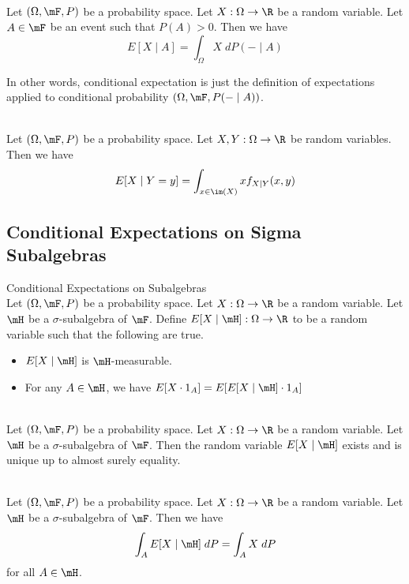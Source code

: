 \documentclass[a4paper]{article}
\begin{document}
\begin{lmm}{}{}\\
Let $(\Omega,\mF,P)$ be a probability space. Let $X:\Omega\to\R$ be a random variable. Let $A\in\mF$ be an event such that $P(A)>0$. Then we have $$E[X\;|\;A]=\int_\Omega X\;dP(-\;|\;A)$$
\end{lmm}

In other words, conditional expectation is just the definition of expectations applied to conditional probability $(\Omega,\mF,P(-\;|\;A))$. 

\begin{lmm}{}{}\\
Let $(\Omega,\mF,P)$ be a probability space. Let $X,Y:\Omega\to\R$ be random variables. Then we have $$E[X\;|\;Y=y]=\int_{x\in\im(X)}xf_{X|Y}(x,y)$$
\end{lmm}

\subsection{Conditional Expectations on Sigma Subalgebras}
\begin{defn}{Conditional Expectations on Subalgebras}{}\\
Let $(\Omega,\mF,P)$ be a probability space. Let $X:\Omega\to\R$ be a random variable. Let $\mH$ be a $\sigma$-subalgebra of $\mF$. Define $E[X\;|\;\mH]:\Omega\to\R$ to be a random variable such that the following are true. 
\begin{itemize}
\item $E[X\;|\;\mH]$ is $\mH$-measurable. 
\item For any $A\in\mH$, we have $E[X\cdot 1_A]=E[E[X\;|\;\mH]\cdot 1_A]$
\end{itemize}
\end{defn}

\begin{lmm}{}{}\\
Let $(\Omega,\mF,P)$ be a probability space. Let $X:\Omega\to\R$ be a random variable. Let $\mH$ be a $\sigma$-subalgebra of $\mF$. Then the random variable $E[X\;|\;\mH]$ exists and is unique up to almost surely equality. 
\end{lmm}

\begin{lmm}{}{}\\
Let $(\Omega,\mF,P)$ be a probability space. Let $X:\Omega\to\R$ be a random variable. Let $\mH$ be a $\sigma$-subalgebra of $\mF$. Then we have $$\int_AE[X\;|\;\mH]\;dP=\int_AX\;dP$$ for all $A\in\mH$. 
\end{lmm}
\end{document}
